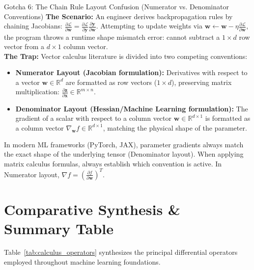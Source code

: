 \begin{trapbox}{Gotcha 6: The Chain Rule Layout Confusion (Numerator vs. Denominator Conventions)}
\textbf{The Scenario:} An engineer derives backpropagation rules by chaining Jacobians: $\frac{\partial \mathcal{L}}{\partial \mathbf{w}} = \frac{\partial \mathcal{L}}{\partial \mathbf{y}} \frac{\partial \mathbf{y}}{\partial \mathbf{w}}$. Attempting to update weights via $\mathbf{w} \leftarrow \mathbf{w} - \eta \frac{\partial \mathcal{L}}{\partial \mathbf{w}}$, the program throws a runtime shape mismatch error: cannot subtract a $1 \times d$ row vector from a $d \times 1$ column vector. \\
\textbf{The Trap:} Vector calculus literature is divided into two competing conventions:
\begin{itemize}
    \item \textbf{Numerator Layout (Jacobian formulation):} Derivatives with respect to a vector $\mathbf{w} \in \mathbb{R}^d$ are formatted as row vectors ($1 \times d$), preserving matrix multiplication: $\frac{\partial \mathbf{z}}{\partial \mathbf{x}} \in \mathbb{R}^{m \times n}$.
    \item \textbf{Denominator Layout (Hessian/Machine Learning formulation):} The gradient of a scalar with respect to a column vector $\mathbf{w} \in \mathbb{R}^{d \times 1}$ is formatted as a column vector $\nabla_{\mathbf{w}} f \in \mathbb{R}^{d \times 1}$, matching the physical shape of the parameter.
\end{itemize}
In modern ML frameworks (PyTorch, JAX), parameter gradients always match the exact shape of the underlying tensor (Denominator layout). When applying matrix calculus formulas, always establish which convention is active. In Numerator layout, $\nabla f = (\frac{\partial f}{\partial \mathbf{w}})^T$.
\end{trapbox}

\section{Comparative Synthesis \& Summary Table}

Table~\ref{tab:calculus_operators} synthesizes the principal differential operators employed throughout machine learning foundations.

